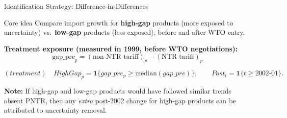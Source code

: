 \documentclass[aspectratio=169]{beamer}
\begin{document}
\begin{frame}{Identification Strategy: Difference-in-Differences}
  \small
  \begin{block}{Core idea}
    Compare import growth for \textbf{high-gap} products (more exposed to uncertainty) vs.\ \textbf{low-gap} products (less exposed), before and after WTO entry.
  \end{block}



  \vspace{0.2cm}
  \textbf{Treatment exposure (measured in 1999, before WTO negotiations):}
  \begin{equation*}
    \text{gap\_pre}_p = (\text{non-NTR tariff})_p - (\text{NTR tariff})_p
  \end{equation*}

  \[
    (treatment) \quad HighGap_p = \mathbf{1}\{gap\_pre_p \ge \text{median}(gap\_pre)\},\qquad Post_t=\mathbf{1}\{t\ge 2002\text{-}01\}.
  \]
  \vspace{0.2cm}

  \textbf{Note:} If high-gap and low-gap products would have followed similar trends absent PNTR, then any \emph{extra} post-2002 change for high-gap products can be attributed to uncertainty removal.

\end{frame}

\end{document}
